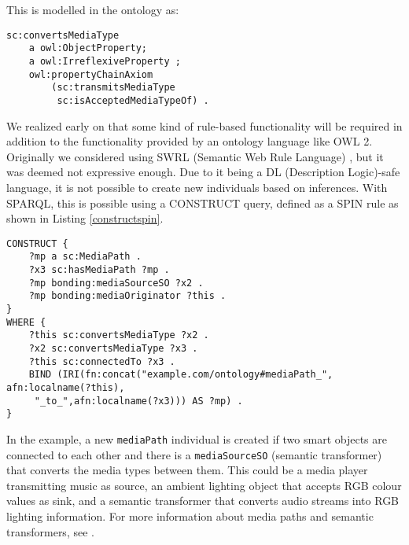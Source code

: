 This is modelled in the ontology as:
\begin{verbatim}
sc:convertsMediaType
	a owl:ObjectProperty; 
	a owl:IrreflexiveProperty ;
    owl:propertyChainAxiom
    	(sc:transmitsMediaType 
		 sc:isAcceptedMediaTypeOf) .
\end{verbatim}

We realized early on that some kind of rule-based functionality will be required in addition to the functionality provided by an ontology language like OWL 2. Originally we considered using SWRL (Semantic Web Rule Language) \cite{Niezen2011}, but it was deemed not expressive enough. Due to it being a DL (Description Logic)-safe language, it is not possible to create new individuals based on inferences. With SPARQL, this is possible using a CONSTRUCT query, defined as a SPIN rule as shown in Listing \ref{constructspin}.


\begin{figure*} %
\begin{verbatim} 
CONSTRUCT {
    ?mp a sc:MediaPath .
    ?x3 sc:hasMediaPath ?mp .
    ?mp bonding:mediaSourceSO ?x2 .
    ?mp bonding:mediaOriginator ?this .
}
WHERE {
    ?this sc:convertsMediaType ?x2 .
    ?x2 sc:convertsMediaType ?x3 .
    ?this sc:connectedTo ?x3 .
    BIND (IRI(fn:concat("example.com/ontology#mediaPath_", afn:localname(?this),
     "_to_",afn:localname(?x3))) AS ?mp) .
}
\end{verbatim} 
\label{constructspin}
\end{figure*}

In the example, a new \texttt{mediaPath} individual is created if two smart objects are connected to each other and there is a \texttt{mediaSourceSO} (semantic transformer) that converts the media types between them. This could be a media player transmitting music as source, an ambient lighting object that accepts RGB colour values as sink, and a semantic transformer that converts audio streams into RGB lighting information. For more information about media paths and semantic transformers, see \cite{Niezen2011}.

